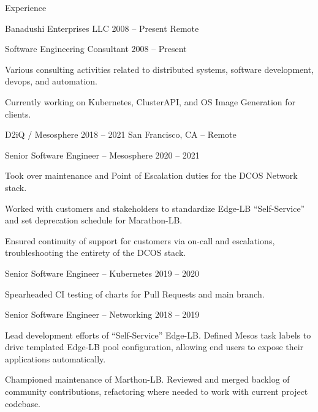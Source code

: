 \documentclass{resume}
\begin{document}
\begin{rSection}{Experience}
        \begin{rSubsection}{Banadushi Enterprises LLC}
            {2008 -- Present} %
            {Remote} %
            \begin{rSubsubsection}{Software Engineering Consultant} %
                {2008 -- Present} %
            \item Various consulting activities related to distributed
                systems, software development, devops, and automation.
            \item Currently working on Kubernetes, ClusterAPI, and OS Image
                Generation for clients.
            \end{rSubsubsection}
        \end{rSubsection}
        \begin{rSubsection}{D2iQ / Mesosphere}
            {2018 -- 2021} %
            {San Francisco, CA -- Remote} %
            \begin{rSubsubsection}{Senior Software Engineer -- Mesosphere} %
                {2020 -- 2021} %
            \item Took over maintenance and Point of Escalation duties for the DCOS
                Network stack.
            \item Worked with customers and stakeholders to standardize Edge-LB
                ``Self-Service'' and set deprecation schedule for Marathon-LB\@.
            \item Ensured continuity of support for customers via on-call and
                escalations, troubleshooting the entirety of the DCOS stack.
            \end{rSubsubsection}
            \begin{rSubsubsection}{Senior Software Engineer -- Kubernetes} %
                {2019 -- 2020} %
            \item Spearheaded CI testing of charts for Pull Requests and main branch.
            \end{rSubsubsection}
            \begin{rSubsubsection}{Senior Software Engineer -- Networking} %
                {2018 -- 2019} %
            \item Lead development efforts of ``Self-Service'' Edge-LB\@. Defined Mesos
                task labels to drive templated Edge-LB pool configuration, allowing
                end users to expose their applications automatically.
            \item Championed maintenance of Marthon-LB\@. Reviewed and merged backlog of
                community contributions, refactoring where needed to work with current
                project codebase.
            \end{rSubsubsection}
        \end{rSubsection}


\end{rSection}
\end{document}
